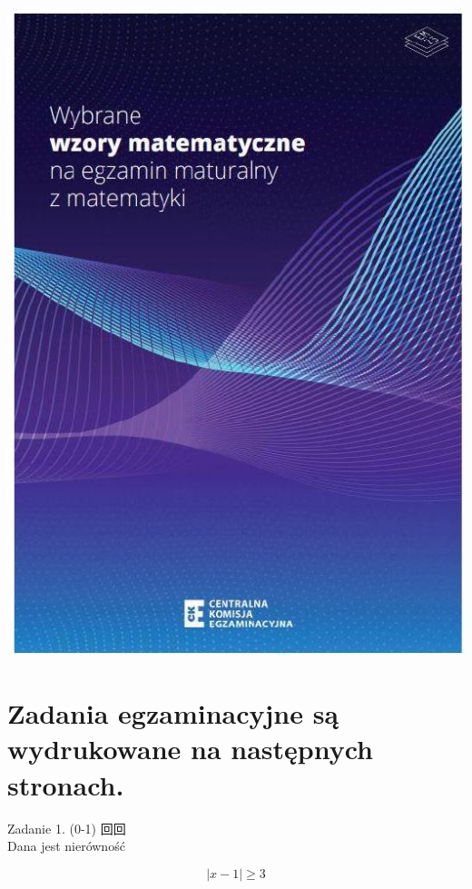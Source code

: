 \documentclass[10pt]{article}
\begin{document}
\begin{enumerate}
\includegraphics[max width=\textwidth, center]{2024_11_21_daeb5e5efb43dd4cb535g-02(1)}
\end{enumerate}

\section*{Zadania egzaminacyjne są wydrukowane na następnych stronach.}
Zadanie 1. (0-1) 回回\\
Dana jest nierówność

\[
|x-1| \geq 3
\]
\end{document}
